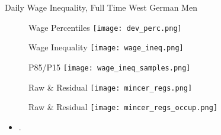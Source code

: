 \documentclass{beamer}
\let\oldcite=\cite
\renewcommand{\cite}[1]{\textcolor[rgb]{.0,.2,.7}{\oldcite{#1}}}
\begin{document}



\begin{frame}{Daily Wage Inequality, Full Time West German Men}
\begin{figure}[!t]
\centering
\begin{minipage}[b]{0.32\textwidth}{Wage Percentiles}
\centering
\texttt{[image: dev\_perc.png]}
\end{minipage}
\begin{minipage}[b]{0.32\textwidth}{Wage Inequality}
\centering
\texttt{[image: wage\_ineq.png]}
\end{minipage}
\begin{minipage}[b]{0.32\textwidth}{P85/P15}
\centering
\texttt{[image: wage\_ineq\_samples.png]}
\end{minipage}
\begin{minipage}[b]{0.32\textwidth}{Raw \& Residual}
\centering
\texttt{[image: mincer\_regs.png]}
\end{minipage}
\begin{minipage}[b]{0.32\textwidth}{Raw \& Residual}
\centering
\texttt{[image: mincer\_regs\_occup.png]}
\end{minipage}
\end{figure}
\begin{itemize}
\setlength{\itemsep}{0.7 cm}
\item \cite{CaHeKl13}.
\end{itemize}
\end{frame}
\end{document}
